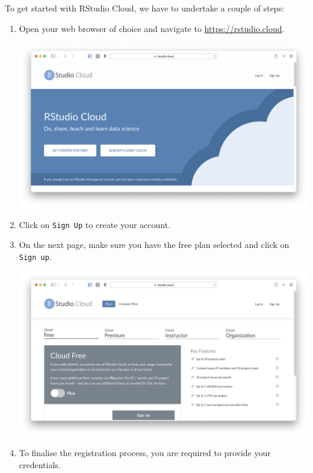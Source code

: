 \documentclass[
  letterpaper,
]{krantz}
\begin{document}
To get started with RStudio Cloud, we have to undertake a couple of
steps:

\begin{enumerate}
\def\labelenumi{\arabic{enumi}.}
\item
  Open your web browser of choice and navigate to
  \url{https://rstudio.cloud}.

  \includegraphics{images/chapter_03_img/rstudio_cloud/01_rstudio_cloud.png}
\item
  Click on \texttt{Sign\ Up} to create your account.
\item
  On the next page, make sure you have the free plan selected and click
  on \texttt{Sign\ up}.

  \includegraphics{images/chapter_03_img/rstudio_cloud/02_rstudio_cloud.png}
\item
  To finalise the registration process, you are required to provide your
  credentials.


\end{enumerate}
\end{document}

